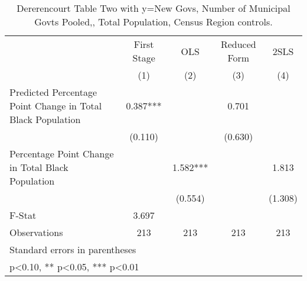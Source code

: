 \begin{table}[htbp]\centering
\def\sym#1{\ifmmode^{#1}\else\(^{#1}\)\fi}
\caption{Dererencourt Table Two with y=New Govs, Number of Municipal Govts  Pooled,, Total Population, Census Region controls.}
\begin{tabular}{l*{4}{c}}
\toprule
                    & First Stage   &         OLS   &Reduced Form   &        2SLS   \\
                    &\multicolumn{1}{c}{(1)}   &\multicolumn{1}{c}{(2)}   &\multicolumn{1}{c}{(3)}   &\multicolumn{1}{c}{(4)}   \\
\midrule
Predicted Percentage Point Change in Total Black Population&       0.387***&               &       0.701   &               \\
                    &     (0.110)   &               &     (0.630)   &               \\
\addlinespace
Percentage Point Change in Total Black Population&               &       1.582***&               &       1.813   \\
                    &               &     (0.554)   &               &     (1.308)   \\
\midrule
F-Stat              &       3.697   &               &               &               \\
Observations        &         213   &         213   &         213   &         213   \\
\bottomrule
\multicolumn{5}{l}{\footnotesize Standard errors in parentheses}\\
\multicolumn{5}{l}{\footnotesize * p<0.10, ** p<0.05, *** p<0.01}\\
\end{tabular}
\end{table}
